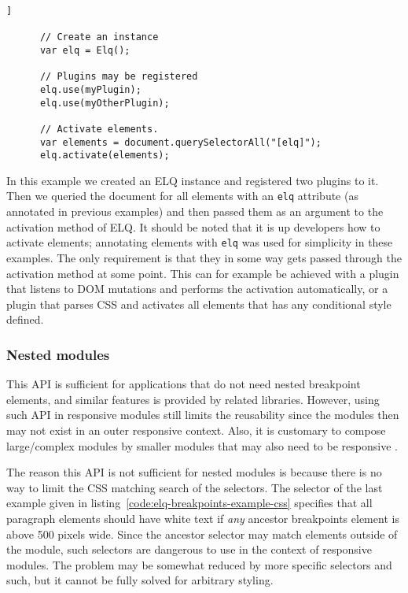 \documentclass{acm_proc_article-sp}
\newcommand{\code}[1]{\texttt{#1}}
\newcommand{\elq}{ELQ}
\begin{document}
    \begin{lstlisting}[gobble=6,caption={}]]

      // Create an instance
      var elq = Elq();

      // Plugins may be registered
      elq.use(myPlugin);
      elq.use(myOtherPlugin);

      // Activate elements.
      var elements = document.querySelectorAll("[elq]");
      elq.activate(elements);

    \end{lstlisting}

    In this example we created an \elq{} instance and registered two plugins to it.
    Then we queried the document for all elements with an \code{elq} attribute (as annotated in previous examples) and then passed them as an argument to the activation method of \elq{}.
    It should be noted that it is up developers how to activate elements; annotating elements with \code{elq} was used for simplicity in these examples.
    The only requirement is that they in some way gets passed through the activation method at some point.
    This can for example be achieved with a plugin that listens to DOM mutations and performs the activation automatically, or a plugin that parses CSS and activates all elements that has any conditional style defined.

    \subsubsection{Nested modules}
      This API is sufficient for applications that do not need nested breakpoint elements, and similar features is provided by related libraries.
      However, using such API in responsive modules still limits the reusability since the modules then may not exist in an outer responsive context.
      Also, it is customary to compose large/complex modules by smaller modules that may also need to be responsive \cite{parnas1972criteria}.

      The reason this API is not sufficient for nested modules is because there is no way to limit the CSS matching search of the selectors.
      The selector of the last example given in listing~\ref{code:elq-breakpoints-example-css} specifies that all paragraph elements should have white text if \emph{any} ancestor breakpoints element is above 500 pixels wide.
      Since the ancestor selector may match elements outside of the module, such selectors are dangerous to use in the context of responsive modules.
      The problem may be somewhat reduced by more specific selectors and such, but it cannot be fully solved for arbitrary styling.
\end{document}
